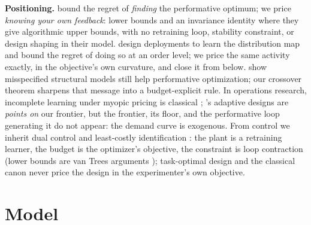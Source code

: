 \documentclass{article}
\begin{document}
\textbf{Positioning.} \citet{jagadeesan2022regret} bound the regret of \emph{finding} the performative optimum; we price \emph{knowing your own feedback}: lower bounds and an invariance identity where they give algorithmic upper bounds, with no retraining loop, stability constraint, or design shaping in their model. \citet{bracale2025reverse} design deployments to learn the distribution map and bound the regret of doing so at an order level; we price the same activity exactly, in the objective's own curvature, and close it from below. \citet{lin2024plugin} show misspecified structural models still help performative optimization; our crossover theorem sharpens that message into a budget-explicit rule. In operations research, incomplete learning under myopic pricing is classical \citep{rothschild1974two,harrison2012bayesian,keskin2014dynamic,broder2012dynamic,denboer2015dynamic}; \citet{lai1979adaptive}'s adaptive designs are \emph{points on} our frontier, but the frontier, its floor, and the performative loop generating it do not appear: the demand curve is exogenous. From control we inherit dual control \citep{feldbaum1960dual} and least-costly identification \citep{bombois2006least}: the plant is a retraining learner, the budget is the optimizer's objective, the constraint is loop contraction (lower bounds are van Trees arguments \citep{gill1995applications}); task-optimal design \citep{wagenmaker2021task,dean2020sample} and the classical canon \citep{kiefer1960equivalence,pukelsheim2006optimal} never price the design in the experimenter's own objective.

\section{Model}
\label{sec:model}
\end{document}
